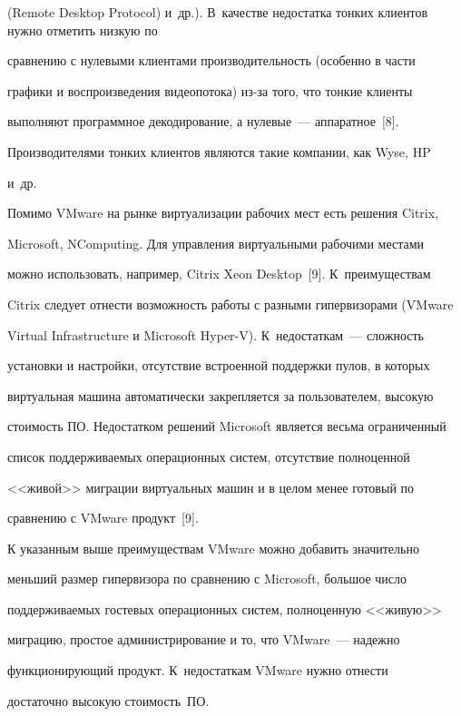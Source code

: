 (Remote Desktop Protocol) и~др.). В~качестве недостатка тонких клиентов нужно отметить низкую по 

сравнению с нулевыми клиентами производительность (особенно в части 

графики и воспроизведения видеопотока) из-за того, что тонкие клиенты 

выполняют программное декодирование, а нулевые~--- аппаратное~[8]. 

Производителями тонких клиентов являются такие компании, как Wyse, HP 

и~др. 

  

  Помимо VMware на рынке виртуализации рабочих мест есть решения Citrix, 

Microsoft, NComputing. Для управления виртуальными рабочими местами 

можно использовать, например, Citrix Xeon Desktop~[9]. К~преимуществам 

Citrix следует отнести возможность работы с разными гипервизорами (VMware 

Virtual Infrastructure и Microsoft Hyper-V). К~недостаткам~--- сложность 

установки и настройки, отсутствие встроенной поддержки пулов, в которых 

виртуальная машина автоматически закрепляется за пользователем, высокую 

стоимость ПО. Недостатком решений Microsoft является весьма ограниченный 

список поддерживаемых операционных систем, отсутствие полноценной 

<<живой>> миграции виртуальных машин и в целом менее готовый по 

сравнению с VMware продукт~[9].

{



}

  

  К указанным выше преимуществам VMware можно добавить значительно 

меньший размер гипервизора по сравнению с Microsoft, большое число 

поддерживаемых гостевых операционных систем, полноценную <<живую>> 

миграцию, простое администрирование и то, что VMware~--- надежно 

функционирующий продукт. К~недостаткам VMware нужно отнести 

достаточно высокую сто\-и\-мость~ПО.








